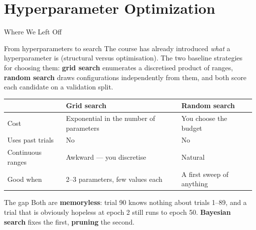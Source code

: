\section{Hyperparameter Optimization}

\begin{frame}{Where We Left Off}

    \begin{block}{From hyperparameters to search}
        The course has already introduced \emph{what} a hyperparameter is (structural versus
        optimisation). The two baseline strategies for choosing them: \textbf{grid search} enumerates
        a discretised product of ranges, \textbf{random search} draws configurations independently
        from them, and both score each candidate on a validation split.
    \end{block}

    \vspace{0.18em}
    \centering
    \renewcommand{\arraystretch}{1.3}
    {\scriptsize
    \begin{tabular}{p{3.1cm}|p{4.0cm}|p{4.0cm}}
        \toprule
                        & \textbf{Grid search} & \textbf{Random search} \\
        \midrule
        Cost            & Exponential in the number of parameters & You choose the budget \\
        Uses past trials & No & No \\
        Continuous ranges & Awkward --- you discretise & Natural \\
        Good when        & 2--3 parameters, few values each & A first sweep of anything \\
        \bottomrule
    \end{tabular}}

    \vspace{0.3em}
    \begin{alertblock}{The gap}
        Both are \textbf{memoryless}: trial 90 knows nothing about trials 1--89, and a trial that is
        obviously hopeless at epoch 2 still runs to epoch 50. \textbf{Bayesian search} fixes the first,
        \textbf{pruning} the second.
    \end{alertblock}

\end{frame}
